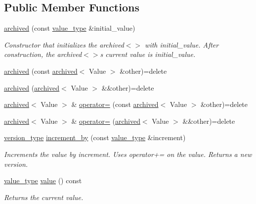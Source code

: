 \subsection*{Public Member Functions}
\begin{DoxyCompactItemize}
\item 
\hyperlink{classarchived_a752f1c457d9431caab148b866fc34c0f}{archived} (const \hyperlink{classarchived_a0f6c13c55e504fe3bbfc04f3896e5abc}{value\+\_\+type} \&initial\+\_\+value)
\begin{DoxyCompactList}\small\item\em Constructor that initializes the archived$<$$>$ with initial\+\_\+value. After construction, the archived$<$$>$\textquotesingle{}s current value is initial\+\_\+value. \end{DoxyCompactList}\item 
\hyperlink{classarchived_a9867dabd20017e71b02ce9fe6f5ad824}{archived} (const \hyperlink{classarchived}{archived}$<$ Value $>$ \&other)=delete
\item 
\hyperlink{classarchived_a0aa3fd83a51267b2d77baeeca539e689}{archived} (\hyperlink{classarchived}{archived}$<$ Value $>$ \&\&other)=delete
\item 
\hyperlink{classarchived}{archived}$<$ Value $>$ \& \hyperlink{classarchived_a2b77c3406e1344409c839cbce3269c7c}{operator=} (const \hyperlink{classarchived}{archived}$<$ Value $>$ \&other)=delete
\item 
\hyperlink{classarchived}{archived}$<$ Value $>$ \& \hyperlink{classarchived_add4b63a811b7ee6506ed32054c646f44}{operator=} (\hyperlink{classarchived}{archived}$<$ Value $>$ \&\&other)=delete
\item 
\hyperlink{classarchived_a75b8e571e7c6aca9432b9aa2ba601c00}{version\+\_\+type} \hyperlink{classarchived_a8d1c7030894bf31b7add0bccd041d69a}{increment\+\_\+by} (const \hyperlink{classarchived_a0f6c13c55e504fe3bbfc04f3896e5abc}{value\+\_\+type} \&increment)
\begin{DoxyCompactList}\small\item\em Increments the value by increment. Uses operator+= on the value. Returns a new version. \end{DoxyCompactList}\item 
\hyperlink{classarchived_a0f6c13c55e504fe3bbfc04f3896e5abc}{value\+\_\+type} \hyperlink{classarchived_af69a2753a3b9844609a4b2684e4e0bf3}{value} () const 
\begin{DoxyCompactList}\small\item\em Returns the current value. \end{DoxyCompactList}\item 

\end{DoxyCompactItemize}
